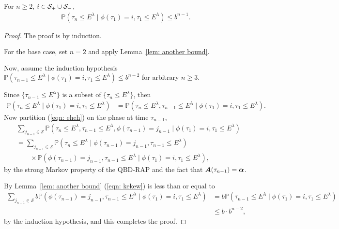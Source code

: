 \begin{lem}\label{lem: another bound 2}
	For \(n\geq 2\), \(i\in\mathcal S_+\cup \mathcal{S}_-\), 
	\begin{align}
		\mathbb P(\tau_n \leq E^\lambda \mid \phi(\tau_1) = i, \tau_1\leq E^\lambda) \leq b^{n-1}.
	\end{align}
\end{lem}
\begin{proof}
	The proof is by induction. 
	
	For the base case, set \(n=2\) and apply Lemma~\ref{lem: another bound}.

	Now, assume the induction hypothesis \(\mathbb P(\tau_{n-1} \leq E^\lambda \mid \phi(\tau_1) = i, \tau_1\leq E^\lambda) \leq b^{n-2}\) for arbitrary \(n\geq 3\). 
	
	Since \(\{\tau_{n-1}\leq E^\lambda\}\) is a subset of \(\{\tau_{n}\leq E^\lambda\}\), then 
	\begin{align}
		 \mathbb P(   \tau_n \leq E^\lambda \mid \phi(\tau_1) = i, \tau_1\leq E^\lambda)
		&= \mathbb P(   \tau_n \leq E^\lambda,  \tau_{n-1} \leq E^\lambda  \mid \phi(\tau_1) = i, \tau_1\leq E^\lambda). \label{eqn: eheh}
	\end{align}
	Now partition (\ref{eqn: eheh}) on the phase at time \(\tau_{n-1}\),
	\begin{align}
		\nonumber&\sum_{j_{n-1}\in\mathcal S}\mathbb P(  \tau_n \leq E^\lambda,  \tau_{n-1} \leq E^\lambda,\phi(\tau_{n-1}) = j_{n-1} \mid \phi(\tau_1) = i, \tau_1\leq E^\lambda)
		\\&\nonumber=  \sum_{j_{n-1}\in\mathcal S}\mathbb P(  \tau_{n}\leq E^\lambda\mid   \phi(\tau_{n-1}) = j_{n-1}, \tau_{n-1} \leq E^\lambda)
		\\&\qquad\times\mathbb P( \phi(\tau_{n-1}) = j_{n-1}, \tau_{n-1}\leq E^\lambda \mid \phi(\tau_1) = i, \tau_1\leq E^\lambda), \label{eqn: kekew}
	\end{align}
	by the strong Markov property of the QBD-RAP and the fact that \(\boldsymbol A(\tau_{n-1})=\boldsymbol \alpha\). 
	 
	By Lemma~\ref{lem: another bound} (\ref{eqn: kekew}) is less than or equal to 
	\begin{align}
		\sum_{j_{n-1}\in\mathcal S} b
		\mathbb P(  \phi(\tau_{n-1}) = j_{n-1}, \tau_{n-1}\leq E^\lambda\mid \phi(\tau_1) = i, \tau_1\leq E^\lambda)
		&= b
		\mathbb P( \tau_{n-1}\leq E^\lambda\mid \phi(\tau_1) = i, \tau_1\leq E^\lambda)\nonumber
		\\&\leq b\cdot b^{n-2},
	\end{align}
	by the induction hypothesis, and this completes the proof. 
\end{proof}
